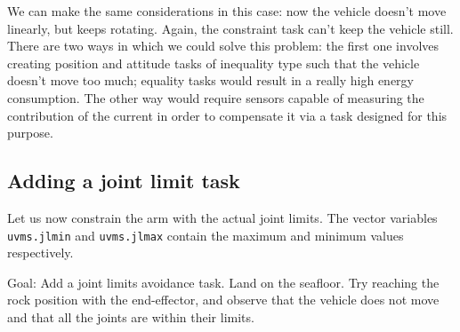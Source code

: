 \documentclass{article}
\begin{document}
We can make the same considerations in this case: now the vehicle doesn't move linearly, but keeps rotating. Again, the constraint task can't keep the vehicle still.\\
There are two ways in which we could solve this problem: the first one involves creating position and attitude tasks of inequality type such that the vehicle doesn't move too much; equality tasks would result in a really high energy consumption. The other way would require sensors capable of measuring the contribution of the current in order to compensate it via a task designed for this purpose.


\subsection{Adding a joint limit task}
Let us now constrain the arm with the actual joint limits. The vector variables \texttt{uvms.jlmin} and \texttt{uvms.jlmax} contain the maximum and minimum values respectively.

Goal: Add a joint limits avoidance task. Land on the seafloor. Try reaching the rock position with the end-effector, and observe that the vehicle does not move and that all the joints are within their limits.
\end{document}
